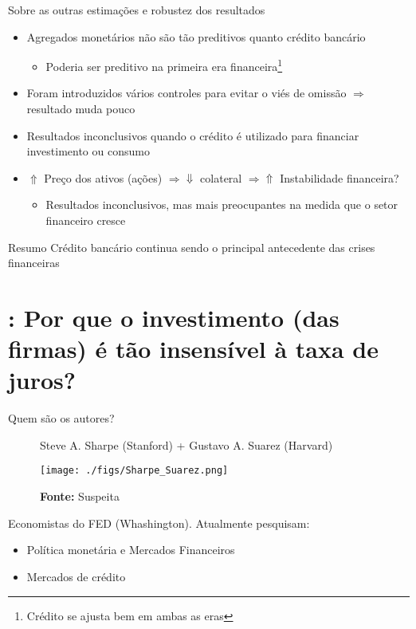 \documentclass[presentation]{beamer}
\begin{document}
\begin{frame}[label={sec:org52b2461}]{Sobre as outras estimações e robustez dos resultados}
\begin{itemize}
\item Agregados monetários não são tão preditivos quanto crédito bancário
\begin{itemize}
\item Poderia ser preditivo na primeira era financeira\footnote{Crédito se ajusta bem em ambas as eras}
\end{itemize}
\item Foram introduzidos vários controles para evitar o viés de omissão \(\Rightarrow\) resultado muda pouco
\item Resultados inconclusivos quando o crédito é utilizado para financiar investimento ou consumo
\item \(\Uparrow\) Preço dos ativos (ações) \(\Rightarrow \Downarrow\) colateral \(\Rightarrow \Uparrow\) Instabilidade financeira?
\begin{itemize}
\item Resultados inconclusivos, mas mais preocupantes na medida que o setor financeiro cresce
\end{itemize}
\end{itemize}


\begin{block}{Resumo}
Crédito bancário continua sendo o principal antecedente das crises financeiras
\end{block}
\end{frame}

\section{\textcite{sharpe_2020_Why}: Por que o investimento (das firmas) é tão insensível à taxa de juros?}
\label{sec:org801c9e5}

\begin{frame}[label={sec:org2395a70}]{Quem são os autores?}
\begin{figure}[htb]
\centering
\caption{Steve A. Sharpe (Stanford) + Gustavo A. Suarez (Harvard)}
\texttt{[image: ./figs/Sharpe\_Suarez.png]}
\label{fig:autores01}
\caption*{\textbf{Fonte:} Suspeita}
\end{figure}

Economistas do FED (Whashington). Atualmente pesquisam:

\begin{itemize}
\item Política monetária e Mercados Financeiros
\item Mercados de crédito
\end{itemize}
\end{frame}
\end{document}
